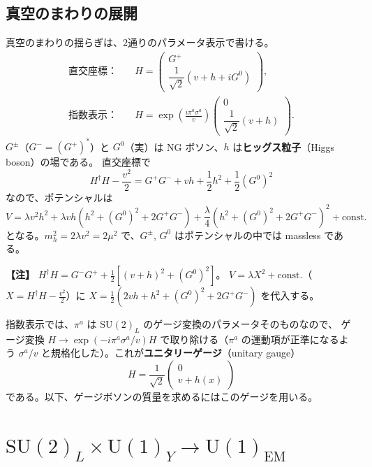 \documentclass[uplatex,dvipdfmx,a4paper,11pt,openany]{jsbook}
\newcommand{\term}[2]{\textbf{#1}（#2）}
\newenvironment{note}{\vspace{1ex}\par\footnotesize\noindent\textbf{【注】}}{\par\vspace{1ex}}
\numberwithin{equation}{chapter}
\theoremstyle{definition}
\theoremstyle{plain}
\theoremstyle{remark}
\newcommand{\SU}{\mathrm{SU}}
\newcommand{\U}{\mathrm{U}}
\begin{document}
\subsection{真空のまわりの展開}
真空のまわりの揺らぎは、2通りのパラメータ表示で書ける。
\begin{align}
\text{直交座標：}&\quad
H=\begin{pmatrix}G^+\\ \dfrac{1}{\sqrt2}\left(v+h+iG^0\right)\end{pmatrix},
\label{eq:H-cartesian}\\
\text{指数表示：}&\quad
H=\exp\!\left(\frac{i\pi^a\sigma^a}{v}\right)\begin{pmatrix}0\\ \dfrac{1}{\sqrt2}(v+h)\end{pmatrix}.
\label{eq:H-exponential}
\end{align}
$G^\pm$（$G^-=(G^+)^*$）と $G^0$（実）は NG ボソン、$h$ は\term{ヒッグス粒子}{Higgs boson}の場である。
直交座標で
\begin{equation}
H^\dagger H-\frac{v^2}{2}=G^+G^-+vh+\frac12h^2+\frac12(G^0)^2
\end{equation}
なので、ポテンシャルは
\begin{equation}
V=\lambda v^2h^2+\lambda vh\left(h^2+(G^0)^2+2G^+G^-\right)+\frac\lambda4\left(h^2+(G^0)^2+2G^+G^-\right)^2+\text{const.}
\label{eq:V-cartesian}
\end{equation}
となる。$m_h^2=2\lambda v^2=2\mu^2$ で、$G^\pm$, $G^0$ はポテンシャルの中では massless である。
\begin{note}
$H^\dagger H=G^-G^++\frac12\left[(v+h)^2+(G^0)^2\right]$。
$V=\lambda X^2+\text{const.}$（$X=H^\dagger H-\frac{v^2}{2}$）に $X=\frac12\left(2vh+h^2+(G^0)^2+2G^+G^-\right)$ を代入する。
\end{note}
指数表示では、$\pi^a$ は $\SU(2)_L$ のゲージ変換のパラメータそのものなので、
ゲージ変換 $H\to\exp(-i\pi^a\sigma^a/v)H$ で取り除ける（$\pi^a$ の運動項が正準になるよう $\sigma^a/v$ と規格化した）。これが\term{ユニタリーゲージ}{unitary gauge}
\begin{equation}
H=\frac{1}{\sqrt2}\begin{pmatrix}0\\ v+h(x)\end{pmatrix}
\label{eq:H-unitary}
\end{equation}
である。以下、ゲージボソンの質量を求めるにはこのゲージを用いる。
\section{$\SU(2)_L\times\U(1)_Y\to\U(1)_{\mathrm{EM}}$}
\label{sec:EW-breaking-pattern}
\end{document}
